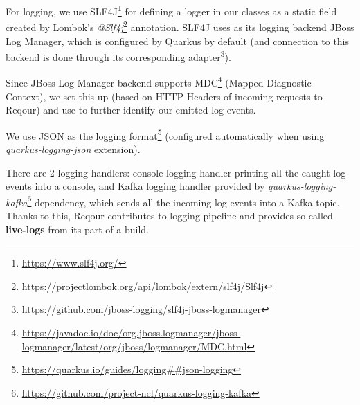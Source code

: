 \documentclass[../main.tex]{subfiles}
\begin{document}
For logging, we use SLF4J\footnote{\url{https://www.slf4j.org/}} for defining a logger in our classes as a static field created by Lombok's \textit{@Slf4j}\footnote{\url{https://projectlombok.org/api/lombok/extern/slf4j/Slf4j}} annotation. SLF4J uses as its logging backend JBoss Log Manager, which is configured by Quarkus by default (and connection to this backend is done through its corresponding adapter\footnote{\url{https://github.com/jboss-logging/slf4j-jboss-logmanager}}).

Since JBoss Log Manager backend supports MDC\footnote{\url{https://javadoc.io/doc/org.jboss.logmanager/jboss-logmanager/latest/org/jboss/logmanager/MDC.html}} (Mapped Diagnostic Context), we set this up (based on HTTP Headers of incoming requests to Reqour) and use to further identify our emitted log events.

We use JSON as the logging format\footnote{\url{https://quarkus.io/guides/logging##json-logging}} (configured automatically when using \textit{quarkus-logging-json} extension).

There are 2 logging handlers: console logging handler printing all the caught log events into a console, and Kafka logging handler provided by \textit{quarkus-logging-kafka}\footnote{\url{https://github.com/project-ncl/quarkus-logging-kafka}} dependency, which sends all the incoming log events into a Kafka topic. Thanks to this, Reqour contributes to logging pipeline and provides so-called \textbf{live-logs} from its part of a build.
\end{document}
